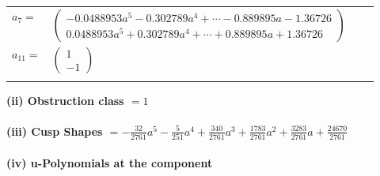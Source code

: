 \documentclass[1p]{elsarticle_modified}
\theoremstyle{definition}
\begin{document}
\begin{tabular}{m{7pt} m{180pt} m{7pt} m{180pt} }
\flushright $a_{7}=$&$\begin{pmatrix}-0.0488953 a^{5}-0.302789 a^{4}+\cdots-0.889895 a-1.36726\\0.0488953 a^{5}+0.302789 a^{4}+\cdots+0.889895 a+1.36726\end{pmatrix}$ \\
\flushright $a_{11}=$&$\begin{pmatrix}1\\-1\end{pmatrix}$\\&\end{tabular}
\flushleft \textbf{(ii) Obstruction class $= 1$}\\~\\
\flushleft \textbf{(iii) Cusp Shapes $= -\frac{32}{2761} a^5-\frac{5}{251} a^4+\frac{340}{2761} a^3+\frac{1783}{2761} a^2+\frac{3283}{2761} a+\frac{24670}{2761}$}\\~\\
\newpage\renewcommand{\arraystretch}{1}
\flushleft \textbf{(iv) u-Polynomials at the component}\newline \\
\end{document}
